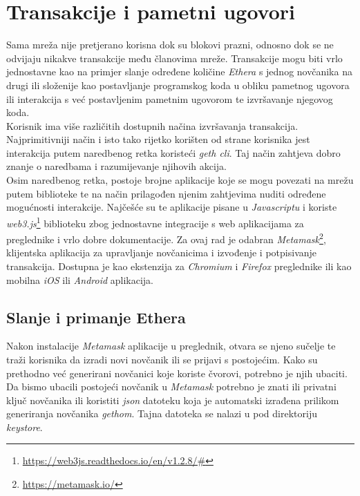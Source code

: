 \documentclass[times, utf8, zavrsni, numeric]{fer}
\begin{document}
\section{Transakcije i pametni ugovori}
Sama mreža nije pretjerano korisna dok su blokovi prazni, odnosno dok se ne odvijaju nikakve transakcije među članovima mreže. Transakcije mogu biti vrlo jednostavne
kao na primjer slanje određene količine \emph{Ethera} s jednog novčanika na drugi ili složenije kao postavljanje programskog koda u obliku pametnog ugovora ili interakcija
s već postavljenim pametnim ugovorom te izvršavanje njegovog koda. \\
Korisnik ima više različitih dostupnih načina izvršavanja transakcija. Najprimitivniji način i isto tako rijetko korišten od strane korisnika jest interakcija putem
naredbenog retka koristeći \emph{geth cli}. Taj način zahtjeva dobro znanje o naredbama i razumijevanje njihovih akcija. \\
Osim naredbenog retka, postoje brojne aplikacije koje se mogu povezati na mrežu putem biblioteke te na način prilagođen njenim zahtjevima nuditi određene mogućnosti
interakcije. Najčešće su te aplikacije pisane u \emph{Javascriptu} i koriste \emph{web3.js}\footnote{\url{https://web3js.readthedocs.io/en/v1.2.8/#}} biblioteku zbog
jednostavne integracije s web aplikacijama za preglednike i vrlo dobre dokumentacije.
Za ovaj rad je odabran \emph{Metamask}\footnote{\url{https://metamask.io/}}, klijentska aplikacija za upravljanje novčanicima i izvođenje i potpisivanje transakcija. 
Dostupna je kao ekstenzija za \emph{Chromium} i \emph{Firefox} preglednike ili kao mobilna \emph{iOS} ili \emph{Android} aplikacija. 
\subsection{Slanje i primanje Ethera}
Nakon instalacije \emph{Metamask} aplikacije u preglednik, otvara se njeno sučelje te traži korisnika da izradi novi novčanik ili se prijavi s postojećim.
Kako su prethodno već generirani novčanici koje koriste čvorovi, potrebno je njih ubaciti. Da bismo ubacili postojeći novčanik u \emph{Metamask} potrebno je znati ili
privatni ključ novčanika ili koristiti \emph{json} datoteku koja je automatski izrađena prilikom generiranja novčanika \emph{gethom}. Tajna datoteka se nalazi
u pod direktoriju \emph{keystore}.
\end{document}

